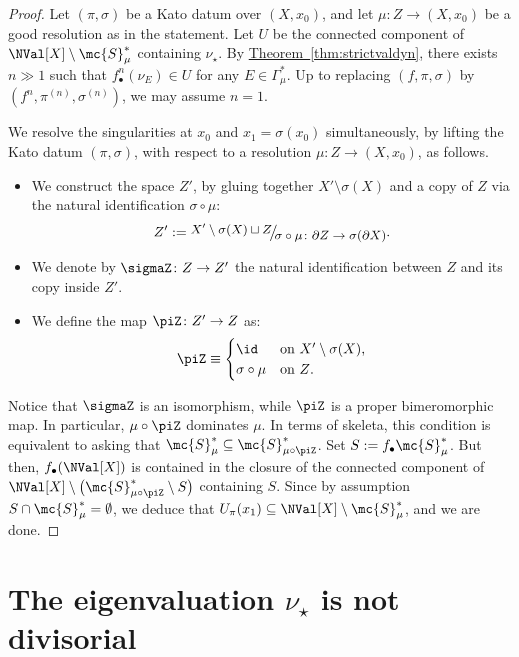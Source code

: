 \documentclass[11 pt, twoside, a4paper]{amsart}
\def\nfrac#1#2{%
    \raise.5ex\hbox{\small{$#1$}}%
    \kern-.18em\big/\kern-.2em%
    \lower.5ex\hbox{\small{$#2$}}}
\newcommand{\dgvert}[1]{\varGamma_{#1}^*}
\newcommand{\Kpi}{{\pi}} %
\newcommand{\Ksigma}{{\sigma}} %
\theoremstyle{definition}
\theoremstyle{definition}
\newcommand{\refprop}[1]{\hyperref[prop:#1]{Proposition~\ref*{prop:#1}}}
\newcommand{\refthm}[1]{\hyperref[thm:#1]{Theorem~\ref*{thm:#1}}}
\begin{document}
\begin{proof}%
Let $(\Kpi,\Ksigma)$ be a Kato datum over $(X,x_0)$, and let $\mu\colon Z \to (X,x_0)$ be a good resolution as in the statement.
Let $U$ be the connected component of $\NVal[X]\setminus \mc{S}_\mu^*$ containing $\nu_\star$. By \refthm{strictvaldyn}, there exists $n \gg 1$ such that $f_\bullet^n(\nu_E) \in U$ for any $E \in \dgvert{\mu}$.
Up to replacing $(f,\Kpi,\Ksigma)$ by $(f^n,\Kpi^{(n)}, \Ksigma^{(n)})$, we may assume $n = 1$.

We resolve the singularities at $x_0$ and $x_1=\Ksigma(x_0)$ simultaneously, by lifting the 
Kato datum $(\Kpi,\Ksigma)$, with respect to a resolution $\mu \colon Z \to (X,x_0)$, as follows.
\begin{itemize}
\item We construct the space $Z'$, by gluing together $X' \setminus \Ksigma(X)$ and a copy of $Z$ via the natural identification $\Ksigma \circ \mu$: 
\[
Z':= \nfrac{X' \setminus \Ksigma(X) \sqcup Z}{\Ksigma \circ \mu \colon \partial Z\to \Ksigma(\partial X)}\text{.}
\]
\item We denote by $\sigmaZ \colon Z \to Z'$ the natural identification between $Z$ and its copy inside $Z'$.
\item We define the map $\piZ \colon Z' \to Z$ as:
\[
\piZ \equiv
\begin{cases}
\id &\text{on } X' \setminus \Ksigma(X)\text{,}\\
\Ksigma \circ \mu &\text{on } Z\text{.}
\end{cases}
\]
\end{itemize}

Notice that $\sigmaZ$ is an isomorphism, while $\piZ$ is a proper bimeromorphic map. In particular, $\mu \circ \piZ$ dominates $\mu$.
In terms of skeleta, this condition is equivalent to asking that $\mc{S}_\mu^* \subseteq \mc{S}_{\mu \circ \piZ}^*$.
Set $S:=f_\bullet \mc{S}_\mu^*$.
But then, $f_\bullet(\NVal[X])$ is contained in the closure of the connected component of $\NVal[X] \setminus \big(\mc{S}_{\mu \circ \piZ}^* \setminus S\big)$ containing $S$.
Since by assumption $S \cap \mc{S}_\mu^* = \emptyset$, we deduce that $U_\Kpi(x_1) \subseteq \NVal[X]\setminus \mc{S}_\mu^*$, and we are done.
\end{proof}


\section{The eigenvaluation $\nu_\star$ is not divisorial}\label{sec:notdivi}
\end{document}
